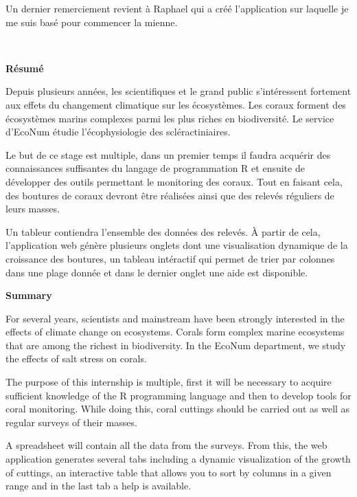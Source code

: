 \documentclass[]{report}
\begin{document}
Un dernier remerciement revient à Raphael qui a créé l'application sur
laquelle je me suis basé pour commencer la mienne. \vfill
\null
\newpage

\textcolor{white}{.}

\Huge 
{\bf Résumé} \vspace{1 cm}

\normalsize

Depuis plusieurs années, les scientifiques et le grand public
s'intéressent fortement aux effets du changement climatique sur les
écosystèmes. Les coraux forment des écosystèmes marins complexes parmi
les plus riches en biodiversité. Le service d'EcoNum étudie
l'écophysiologie des scléractiniaires.

Le but de ce stage est multiple, dans un premier temps il faudra
acquérir des connaissances suffisantes du langage de programmation R et
ensuite de développer des outils permettant le monitoring des coraux.
Tout en faisant cela, des boutures de coraux devront être réalisées
ainsi que des relevés réguliers de leurs masses.

Un tableur contiendra l'ensemble des données des relevés. À partir de
cela, l'application web génère plusieurs onglets dont une visualisation
dynamique de la croissance des boutures, un tableau intéractif qui
permet de trier par colonnes dans une plage donnée et dans le dernier
onglet une aide est disponible.

\vspace{2 cm}

\Huge 
{\bf Summary} \vspace{1 cm}

\normalsize
For several years, scientists and mainstream have been strongly
interested in the effects of climate change on ecosystems. Corals form
complex marine ecosystems that are among the richest in biodiversity. In
the EcoNum department, we study the effects of salt stress on corals.

The purpose of this internship is multiple, first it will be necessary
to acquire sufficient knowledge of the R programming language and then
to develop tools for coral monitoring. While doing this, coral cuttings
should be carried out as well as regular surveys of their masses.

A spreadsheet will contain all the data from the surveys. From this, the
web application generates several tabs including a dynamic visualization
of the growth of cuttings, an interactive table that allows you to sort
by columns in a given range and in the last tab a help is available.
\end{document}
